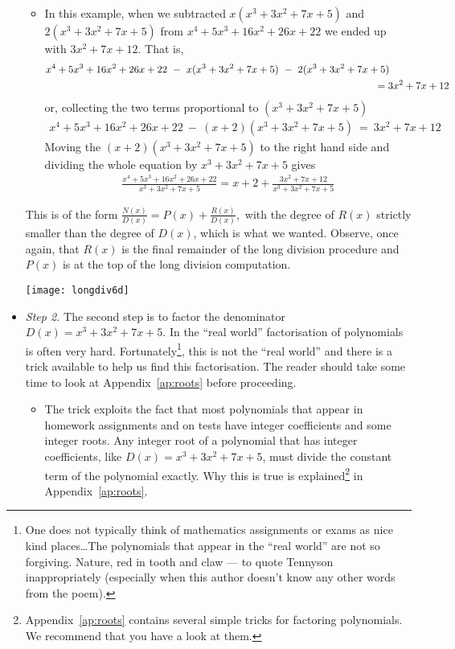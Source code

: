 \begin{eg}
\begin{itemize}
\begin{itemize}
\item In this example, when we subtracted $x(x^3+3x^2+7x+5)$ and
$2(x^3+3x^2+7x+5)$ from $x^4+5x^3+16x^2+26x+22$ we ended up with
$3x^2+7x+12$. That is,
\begin{align*}
&x^4+5x^3+16x^2+26x+22
\ -\ x(x^3+3x^2+7x+5)
\ -\ 2(x^3+3x^2+7x+5) \\
&\hskip4.5in=3x^2+7x+12
\end{align*}
or, collecting the two terms proportional to $(x^3+3x^2+7x+5)$
\begin{align*}
x^4+5x^3+16x^2+26x+22
\ -\ (x+2)(x^3+3x^2+7x+5)
\ =\ 3x^2+7x+12
\end{align*}
Moving the $(x+2)(x^3+3x^2+7x+5)$ to the right hand side and dividing the
whole equation by $x^3+3x^2+7x+5$ gives
\begin{align*}
\frac{x^4+5x^3+16x^2+26x+22}{x^3+3x^2+7x+5}
=x+2+\frac{3x^2+7x+12}{x^3+3x^2+7x+5}
\end{align*}
\end{itemize}

This is of the form
$\frac{N(x)}{D(x)}=P(x)+\frac{R(x)}{D(x)},$
with the degree of $R(x)$
strictly smaller than the degree of $D(x)$, which is what we wanted.
Observe, once again, that $R(x)$ is the final remainder of the long
division procedure and $P(x)$ is at the top of the long division computation.
\begin{center}
\texttt{[image: longdiv6d]}
\end{center}

\item \emph{Step 2.}
The second step is to factor the denominator $D(x)=x^3+3x^2+7x+5$.
In the ``real world'' factorisation of polynomials is often very hard.
Fortunately\footnote{One does not typically think of mathematics assignments or exams
as nice kind places\dots The polynomials that appear in the ``real world'' are not so
forgiving. Nature, red in tooth and claw --- to quote Tennyson inappropriately
(especially when this author doesn't know any other words from the poem).}, this is not
the ``real world'' and there is a trick available to help us find this factorisation. The
reader should take some time to look at Appendix~\ref{ap:roots} before proceeding.

\begin{itemize}
 \item The trick exploits the fact that most polynomials that appear in homework
assignments and on tests have integer coefficients and some integer roots. Any integer
root of a polynomial that has integer coefficients, like $D(x)=x^3+3x^2+7x+5$, must
divide the constant term of the polynomial exactly. Why this is true is
explained\footnote{Appendix~\ref{ap:roots} contains several simple tricks for factoring
polynomials. We recommend that you have a look at them.
} in Appendix~\ref{ap:roots}.


\end{itemize}
\end{itemize}
\end{eg}
